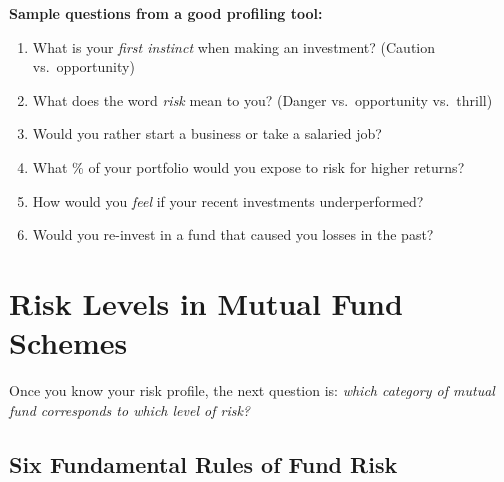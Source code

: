 \documentclass[12pt,a4paper]{article}
\begin{document}
\textbf{Sample questions from a good profiling tool:}
\begin{enumerate}
  \item What is your \textit{first instinct} when making an investment? (Caution vs.\ opportunity)
  \item What does the word \textit{risk} mean to you? (Danger vs.\ opportunity vs.\ thrill)
  \item Would you rather start a business or take a salaried job?
  \item What \% of your portfolio would you expose to risk for higher returns?
  \item How would you \textit{feel} if your recent investments underperformed?
  \item Would you re-invest in a fund that caused you losses in the past?
\end{enumerate}

\section{Risk Levels in Mutual Fund Schemes}

Once you know your risk profile, the next question is: \textit{which category of mutual fund corresponds to which level of risk?}

\subsection{Six Fundamental Rules of Fund Risk}
\end{document}
